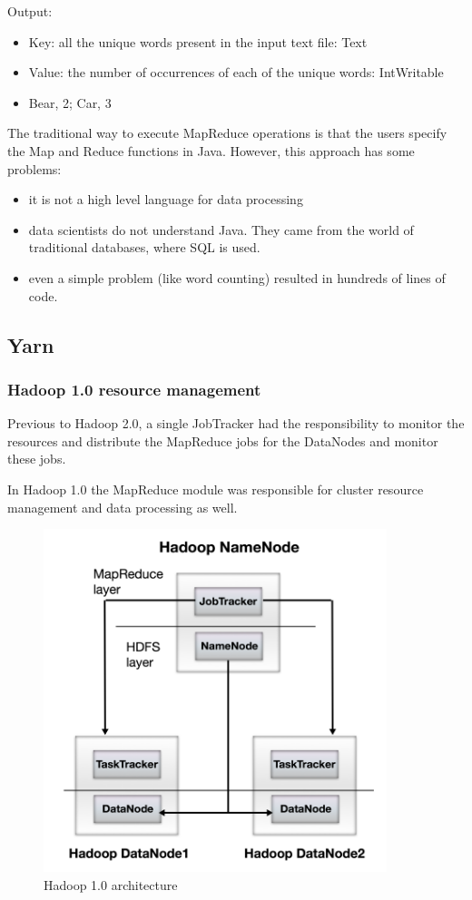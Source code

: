 Output:
\begin{itemize}
	\item Key: all the unique words present in the input text file: Text
	\item Value: the number of occurrences of each of the unique words: IntWritable 
	\item \eg  Bear, 2; Car, 3
\end{itemize}

The traditional way to execute MapReduce operations is that the users specify the Map and Reduce functions in Java. However, this approach has some problems:
\begin{itemize}
	\item it is not a high level language for data processing
	\item data scientists do not understand Java. They came from the world of traditional databases, where SQL is used.
	\item even a simple problem (like word counting) resulted in hundreds of lines of code.
\end{itemize}

\subsection{Yarn \cite{YARN}}
\subsubsection*{Hadoop 1.0 resource management}
Previous to Hadoop 2.0, a single JobTracker had the responsibility to monitor the resources and distribute the MapReduce jobs for the DataNodes and monitor these jobs. 

In Hadoop 1.0 the MapReduce module was responsible for cluster resource management and data processing as well.

\begin{figure}[H]
	\includegraphics[width=100mm, keepaspectratio]{figures/hadoop10.png}
	\centering
	\caption*{Hadoop 1.0 architecture}
	\centering
\end{figure}


